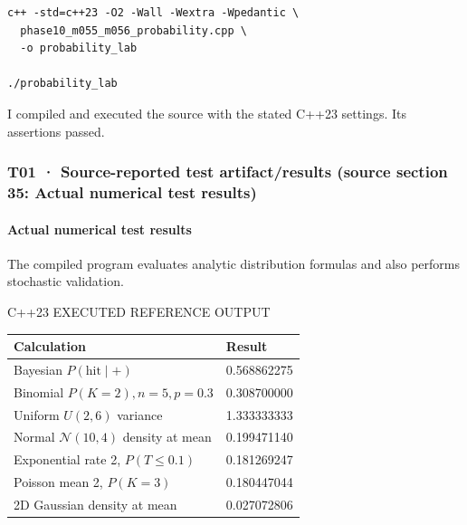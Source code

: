 \begin{verbatim}
c++ -std=c++23 -O2 -Wall -Wextra -Wpedantic \
  phase10_m055_m056_probability.cpp \
  -o probability_lab

./probability_lab
\end{verbatim}

I compiled and executed the source with the stated C++23 settings. Its assertions passed.

\subsubsection{T01 · Source-reported test artifact/results (source section 35: Actual numerical test results)}\label{02-foundations-ii-ch039-t01-source-reported-test-artifactresults-source-section-35-actual-numerical-test-results}

\hypertarget{02-foundations-ii-ch039-t01-source-reported-test-artifactresults-source-section-35-actual-numerical-test-results}{}

\paragraph{Actual numerical test results}\label{02-foundations-ii-ch039-actual-numerical-test-results}

\hypertarget{02-foundations-ii-ch039-actual-numerical-test-results}{}

The compiled program evaluates analytic distribution formulas and also performs stochastic validation.

C++23 EXECUTED REFERENCE OUTPUT

{\def\LTcaptype{none} %
\begin{longtable}[]{@{}ll@{}}
\toprule\noalign{}
Calculation & Result \\
\midrule\noalign{}
\endhead
\bottomrule\noalign{}
\endlastfoot
Bayesian \(P(\text{hit}\mid+)\) & 0.568862275 \\
Binomial \(P(K=2), n=5,p=0.3\) & 0.308700000 \\
Uniform \(U(2,6)\) variance & 1.333333333 \\
Normal \(\mathcal N(10,4)\) density at mean & 0.199471140 \\
Exponential rate 2, \(P(T\le0.1)\) & 0.181269247 \\
Poisson mean 2, \(P(K=3)\) & 0.180447044 \\
2D Gaussian density at mean & 0.027072806 \\
\end{longtable}
}

